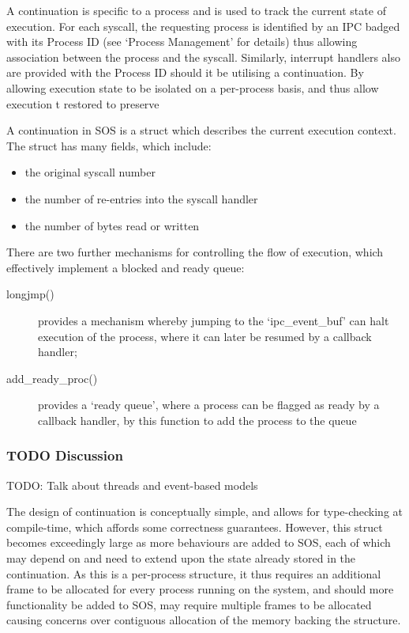 \documentclass[a4paper,12pt]{article}
\begin{document}
A continuation is specific to a process and is used to track the current state
of execution.  For each syscall, the requesting process is identified by an
IPC badged with its Process ID (see `Process Management' for details) thus
allowing association between the process and the syscall.  Similarly,
interrupt handlers also are provided with the Process ID should it be
utilising a continuation.  By allowing execution state to be isolated on a
per-process basis, and thus allow execution t restored to preserve

A continuation in SOS is a struct which describes the current execution
context.  The struct has many fields, which include:

\begin{itemize}
\item the original syscall number
\item the number of re-entries into the syscall handler
\item the number of bytes read or written
\end{itemize}

There are two further mechanisms for controlling the flow of execution, which
effectively implement a blocked and ready queue:
\begin{description}
\item[longjmp()] provides a mechanism whereby jumping to the `ipc\_event\_buf'
  can halt execution of the process, where it can later be resumed by a
  callback handler;
\item[add\_ready\_proc()] provides a `ready queue', where a process can be
  flagged as ready by a callback handler, by this function to add the process
  to the queue
\end{description}

\subsubsection{TODO Discussion}
TODO: Talk about threads and event-based models

The design of continuation is conceptually simple, and allows for
type-checking at compile-time, which affords some correctness guarantees.
However, this struct becomes exceedingly large as more behaviours are added to
SOS, each of which may depend on and need to extend upon the state already
stored in the continuation.  As this is a per-process structure, it thus
requires an additional frame to be allocated for every process running on the
system, and should more functionality be added to SOS, may require multiple
frames to be allocated causing concerns over contiguous allocation of the
memory backing the structure.
\end{document}
